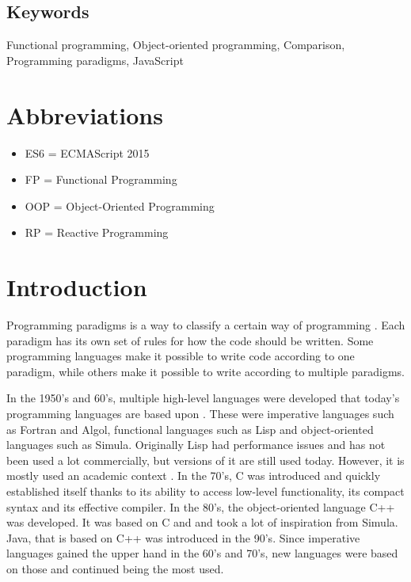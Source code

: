 \documentclass {article}
\begin{document}
\subsection*{Keywords}
Functional programming, Object-oriented programming, Comparison, Programming paradigms, JavaScript
 
\newpage
\tableofcontents
\newpage
{}
\newpage
 

\section*{Abbreviations}
\begin{itemize}[leftmargin=*]
\item [ ] ES6 = ECMAScript 2015
\item [ ] FP = Functional Programming
\item [ ] OOP = Object-Oriented Programming
\item [ ] RP = Reactive Programming
\end{itemize}
 
\newpage
\section{Introduction}
Programming paradigms is a way to classify a certain way of programming \cite{programming-paradigms}. Each paradigm has its own set of rules for how the code should be written. Some programming languages make it possible to write code according to one paradigm,  while others make it possible to write according to multiple paradigms. 
 
In the 1950's and 60's, multiple high-level languages were developed that today's programming languages are based upon \cite{gabmar}. These were imperative languages such as Fortran and Algol, functional languages such as Lisp and object-oriented languages such as Simula. Originally Lisp had performance issues and has not been used a lot commercially, but versions of it are still used today. However, it is mostly used an academic context \cite{gabmar, alomgi}. In the 70's, C was introduced and quickly established itself thanks to its ability to access low-level functionality, its compact syntax and its effective compiler. In the 80's, the object-oriented language C++ was developed. It was based on C and and took a lot of inspiration from Simula. Java, that is based on C++ was introduced in the 90's. Since imperative languages gained the upper hand in the 60's and 70's, new languages were based on those and continued being the most used. 
 
\end{document}

